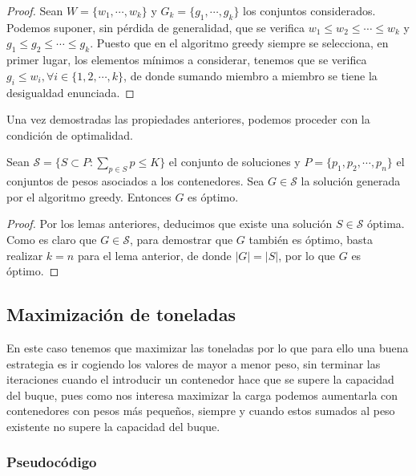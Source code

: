 \begin{proof}
    Sean $W = \{w_1,\cdots, w_k\}$ y $G_k = \{g_1,\cdots,g_k\}$ los conjuntos considerados.
    Podemos suponer, sin pérdida de generalidad, que se verifica
    $w_1 \leq w_2 \leq \cdots \leq w_k$ y $g_1 \leq g_2 \leq \cdots \leq g_k$. 
    Puesto que en el algoritmo greedy siempre se selecciona, en primer lugar, los elementos
    mínimos a considerar, tenemos que se verifica $g_i \leq w_i, \forall i \in \{1,2,\cdots,k\}$,
    de donde sumando miembro a miembro se tiene la desigualdad enunciada.

\end{proof}

Una vez demostradas las propiedades anteriores, podemos proceder con la condición
de optimalidad.

\begin{theorem}
    Sean $\mathcal{S} = \{S \subset P : \sum_{p \in S} p \leq K\}$ el conjunto de soluciones y
    $P = \{p_1,p_2,\cdots,p_n\}$ el conjuntos de pesos asociados
a los contenedores. 
    Sea $G \in \mathcal S$ la solución generada por el algoritmo greedy. Entonces
    $G$ es óptimo. 
\end{theorem}

\begin{proof}
    Por los lemas anteriores, deducimos que existe una solución $S \in \mathcal S$ óptima.
    Como es claro que $G \in \mathcal S$, para demostrar que $G$ también es óptimo, 
    basta realizar $k = n$ para el lema anterior, de donde $|G| = |S|$, por lo que
    $G$ es óptimo.
\end{proof}

\newpage

\subsection{Maximización de toneladas}
En este caso tenemos que maximizar las toneladas por lo que para ello una buena estrategia es ir cogiendo los valores 
de mayor a menor peso, sin terminar las iteraciones cuando el introducir un contenedor hace que se supere la capacidad del
buque, pues como nos interesa maximizar la carga podemos aumentarla con contenedores con pesos más pequeños, siempre y cuando 
estos sumados al peso existente no supere la capacidad del buque.

\subsubsection{Pseudocódigo}

